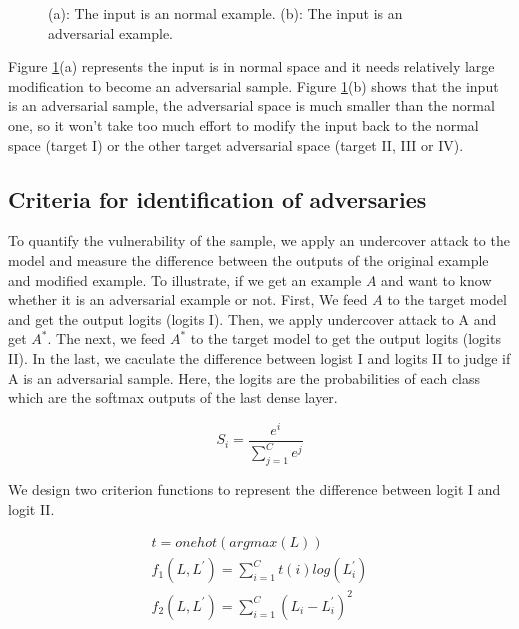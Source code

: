\documentclass{article}
\begin{document}
\begin{figure}[ht]
  \centerline{
  }
  \caption{(a): The input is an normal example. (b): The input is an adversarial example.}
  \label{space}
\end{figure}

Figure \ref{space}(a) represents the input is in normal space and it needs relatively large modification to become an adversarial sample. Figure \ref{space}(b) shows that the input is an adversarial sample, the adversarial space is much smaller than the normal one, so it won't take too much effort to modify the input back to the normal space (target I) or the other target adversarial space (target II, III or IV).

\subsection{Criteria for identification of adversaries}

To quantify the vulnerability of the sample, we apply an undercover attack to the model and measure the difference between the outputs of the original example and modified example. To illustrate, if we get an example $A$ and want to know whether it is an adversarial example or not. First, We feed $A$ to the target model and get the output logits (logits I). Then, we apply undercover attack to A and get $A^*$. The next, we feed $A^*$ to the target model to get the output logits (logits II). In the last, we caculate the difference between logist I and logits II to judge if A is an adversarial sample. Here, the logits are the probabilities of each class which are the softmax outputs of the last dense layer.

\begin{equation}
 	S_i = \frac{e^i}{\sum\limits_{j=1}^{C}e^j}
\end{equation}

We design two criterion functions to represent the difference between logit I and logit II.

\begin{equation}
	\begin{array}{lcl}
		t = onehot(argmax(L)) \\
	 	f_1(L,L^{'})=\sum\limits_{i=1}^{C}t(i)log(L^{'}_i) \\
	 	f_2(L,L^{'})=\sum\limits_{i=1}^{C}(L_i-L^{'}_i)^2
	 \end{array}
\end{equation}
\end{document}
